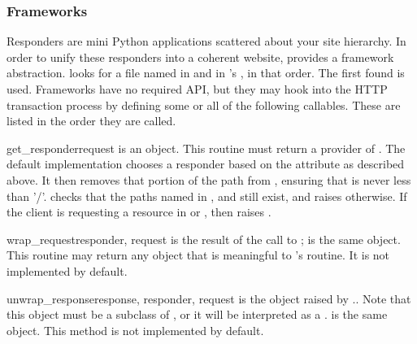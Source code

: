 \subsubsection{Frameworks}

Responders are mini Python applications scattered about your site hierarchy. In
order to unify these responders into a coherent website, 
provides a framework abstraction.  looks for a file named
 in  and in 's , in
that order. The first found is used. Frameworks have no required API, but they
may hook into the HTTP transaction process by defining some or all of the
following callables. These are listed in the order they are called.

\begin{funcdesc}{get_responder}{request}  is an
 object. This routine must return a provider of
. The default implementation chooses a
responder based on the  attribute as described above. It then
removes that portion of the path from , ensuring that
 is never less than '/'.  checks that
the paths named in , \member{__} and  still exist, and
raises 
otherwise. If the client is requesting a resource in \member{__} or
, then  raises .
\end{funcdesc}

\begin{funcdesc}{wrap_request}{responder, request}
 is the result of the call to ;
 is the same  object. This routine may return any
object that is meaningful to 's  routine. It is
not implemented by default.
\end{funcdesc}

\begin{funcdesc}{unwrap_response}{response, responder, request} 
is the object raised by .. Note that this
object must be a subclass of , or it will be interpreted
as a .
 is the same  object. This method is not implemented
by default. \end{funcdesc}

